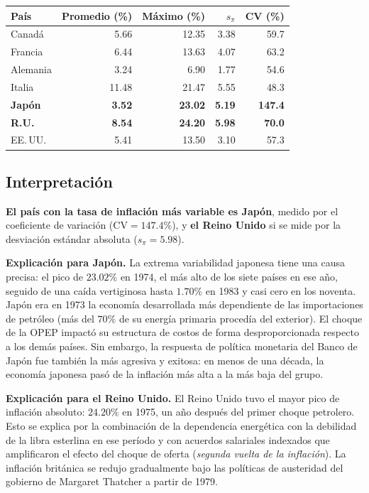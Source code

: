 \documentclass[12pt, letterpaper]{article}
\theoremstyle{remark}
\begin{document}
\begin{center}
\begin{tabular}{lrrrr}
\toprule
\textbf{Pa\'is} & \textbf{Promedio} (\%) & \textbf{M\'aximo} (\%) & $s_\pi$ & \textbf{CV} (\%) \\
\midrule
Canad\'a   &  5.66 & 12.35 & 3.38 &  59.7 \\
Francia    &  6.44 & 13.63 & 4.07 &  63.2 \\
Alemania   &  3.24 &  6.90 & 1.77 &  54.6 \\
Italia     & 11.48 & 21.47 & 5.55 &  48.3 \\
\textbf{Jap\'on}  &  \textbf{3.52} & \textbf{23.02} & \textbf{5.19} & \textbf{147.4} \\
\textbf{R.U.}     &  \textbf{8.54} & \textbf{24.20} & \textbf{5.98} &  \textbf{70.0} \\
EE.\,UU.   &  5.41 & 13.50 & 3.10 &  57.3 \\
\bottomrule
\end{tabular}
\end{center}

\subsection{Interpretaci\'on}

\begin{clave}
\textbf{El pa\'is con la tasa de inflaci\'on m\'as variable es Jap\'on},
medido por el coeficiente de variaci\'on ($\text{CV} = 147.4\%$), y
\textbf{el Reino Unido} si se mide por la desviaci\'on est\'andar absoluta
($s_\pi = 5.98$).

\medskip
\textbf{Explicaci\'on para Jap\'on.} La extrema variabilidad japonesa tiene
una causa precisa: el pico de $23.02\%$ en 1974, el m\'as alto de los siete
pa\'ises en ese a\~no, seguido de una ca\'ida vertiginosa hasta $1.70\%$ en
1983 y casi cero en los noventa. Jap\'on era en 1973 la econom\'ia
desarrollada m\'as dependiente de las importaciones de petr\'oleo (m\'as del
$70\%$ de su energ\'ia primaria proced\'ia del exterior). El choque de la
OPEP impact\'o su estructura de costos de forma desproporcionada respecto a
los dem\'as pa\'ises. Sin embargo, la respuesta de pol\'itica monetaria del
Banco de Jap\'on fue tambi\'en la m\'as agresiva y exitosa: en menos de una
d\'ecada, la econom\'ia japonesa pas\'o de la inflaci\'on m\'as alta a la
m\'as baja del grupo.

\medskip
\textbf{Explicaci\'on para el Reino Unido.} El Reino Unido tuvo el mayor
pico de inflaci\'on absoluto: $24.20\%$ en 1975, un a\~no despu\'es del
primer choque petrolero. Esto se explica por la combinaci\'on de la
dependencia energ\'etica con la debilidad de la libra esterlina en ese
per\'iodo y con acuerdos salariales indexados que amplificaron el efecto
del choque de oferta (\textit{segunda vuelta de la inflaci\'on}). La inflaci\'on
brit\'anica se redujo gradualmente bajo las pol\'iticas de austeridad del
gobierno de Margaret Thatcher a partir de 1979.
\end{clave}
\end{document}
